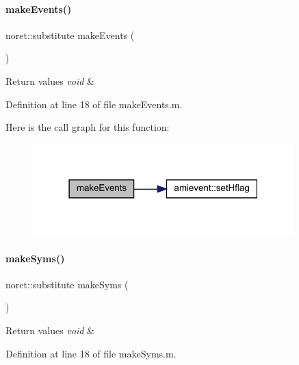 \paragraph{\texorpdfstring{makeEvents()}{makeEvents()}}
{\footnotesize\ttfamily noret\+::substitute make\+Events (\begin{DoxyParamCaption}{ }\end{DoxyParamCaption})}


\begin{DoxyRetVals}{Return values}
{\em void} & \\
\hline
\end{DoxyRetVals}


Definition at line 18 of file make\+Events.\+m.

Here is the call graph for this function\+:
\nopagebreak
\begin{figure}[H]
\begin{center}
\leavevmode
\includegraphics[width=286pt]{classamimodel_a4d4b20c81af6d7ed977b6b818c7b22db_cgraph}
\end{center}
\end{figure}
\mbox{\label{classamimodel_a5aba9155145df4b3f70bfec887c25af9}} 
\paragraph{\texorpdfstring{makeSyms()}{makeSyms()}}
{\footnotesize\ttfamily noret\+::substitute make\+Syms (\begin{DoxyParamCaption}{ }\end{DoxyParamCaption})}


\begin{DoxyRetVals}{Return values}
{\em void} & \\
\hline
\end{DoxyRetVals}


Definition at line 18 of file make\+Syms.\+m.

\mbox{\label{classamimodel_ab566026e57f6cbce21a2a2c72b9f7f2b}} 
